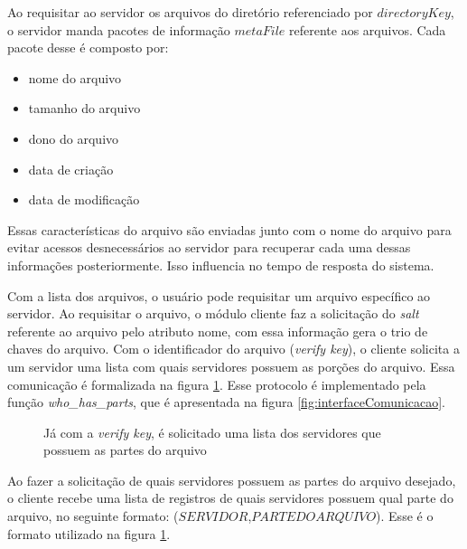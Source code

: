         Ao requisitar ao servidor os arquivos do diretório referenciado por $directoryKey$, o servidor manda pacotes de informação $metaFile$ referente aos arquivos. Cada pacote desse é composto por:
        \begin{itemize}
            \item nome do arquivo
            \item tamanho do arquivo
            \item dono do arquivo
            \item data de criação
            \item data de modificação
        \end{itemize}
        
        Essas características do arquivo são enviadas junto com o nome do arquivo para evitar acessos desnecessários ao servidor para recuperar cada uma dessas informações posteriormente. Isso influencia no tempo de resposta do sistema.
        
        Com a lista dos arquivos, o usuário pode requisitar um arquivo específico ao servidor. Ao requisitar o arquivo, o módulo cliente faz a solicitação do \textit{salt} referente ao arquivo pelo atributo nome, com essa informação gera o trio de chaves do arquivo. Com o identificador do arquivo (\textit{verify key}), o cliente solicita a um servidor uma lista com quais servidores possuem as porções do arquivo. Essa comunicação é formalizada na figura \ref{fig:protWhoHasParts}. Esse protocolo é implementado pela função \textit{who\_has\_parts}, que é apresentada na figura \ref{fig:interfaceComunicacao}.
        
         \begin{figure}[!ht]

        \caption{Já com a \textit{verify key}, é solicitado uma lista dos servidores que possuem as partes do arquivo}
        \label{fig:protWhoHasParts}
        \end{figure}
        
        Ao fazer a solicitação de quais servidores possuem as partes do arquivo desejado, o cliente recebe uma lista de registros de quais servidores possuem qual parte do arquivo, no seguinte formato: ($SERVIDOR$,$PARTE DO ARQUIVO$). Esse é o formato utilizado na figura \ref{fig:protWhoHasParts}.
        
